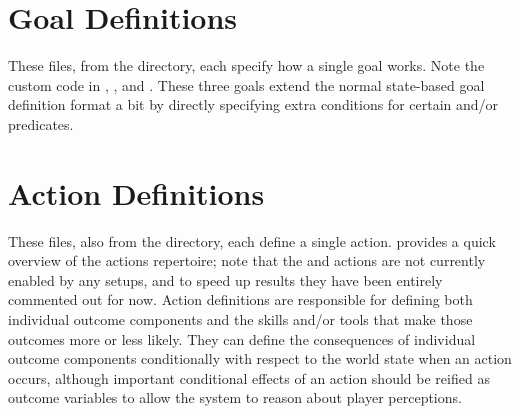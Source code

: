 \section{Goal Definitions}
\label{sec:src-goals}

These files, from the  directory, each specify how a single goal works.
%
Note the custom code in , , and .
%
These three goals extend the normal state-based goal definition format a bit by directly specifying extra conditions for certain  and/or  predicates.


\section{Action Definitions}
\label{sec:src-actions}

These files, also from the  directory, each define a single action.
%
 provides a quick overview of the actions repertoire; note that the   and  actions are not currently enabled by any setups, and to speed up results they have been entirely commented out for now.
%
Action definitions are responsible for defining both individual outcome components and the skills and/or tools that make those outcomes more or less likely.
%
They can define the consequences of individual outcome components conditionally with respect to the world state when an action occurs, although important conditional effects of an action should be reified as outcome variables to allow the system to reason about player perceptions.

